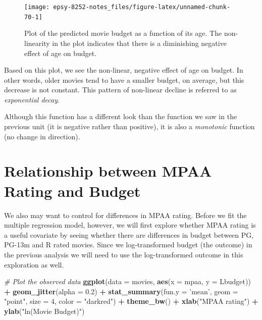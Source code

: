 \documentclass[]{book}
\newenvironment{Shaded}{\begin{snugshade}}{\end{snugshade}}
\newcommand{\CommentTok}[1]{\textcolor[rgb]{0.56,0.35,0.01}{\textit{#1}}}
\newcommand{\DataTypeTok}[1]{\textcolor[rgb]{0.13,0.29,0.53}{#1}}
\newcommand{\DecValTok}[1]{\textcolor[rgb]{0.00,0.00,0.81}{#1}}
\newcommand{\FloatTok}[1]{\textcolor[rgb]{0.00,0.00,0.81}{#1}}
\newcommand{\KeywordTok}[1]{\textcolor[rgb]{0.13,0.29,0.53}{\textbf{#1}}}
\newcommand{\NormalTok}[1]{#1}
\newcommand{\OperatorTok}[1]{\textcolor[rgb]{0.81,0.36,0.00}{\textbf{#1}}}
\newcommand{\StringTok}[1]{\textcolor[rgb]{0.31,0.60,0.02}{#1}}
\begin{document}
\begin{figure}

{\centering \texttt{[image: epsy-8252-notes\_files/figure-latex/unnamed-chunk-70-1]} 

}

\caption{Plot of the predicted movie budget as a function of its age. The non-linearity in the plot indicates that there is a diminishing negative effect of age on budget.}\label{fig:unnamed-chunk-70}
\end{figure}

Based on this plot, we see the non-linear, negative effect of age on budget. In other words, older movies tend to have a smaller budget, on average, but this decrease is not constant. This pattern of non-linear decline is referred to as \emph{exponential decay}.

Although this function has a different look than the function we saw in the previous unit (it is negative rather than positive), it is also a \emph{monotonic} function (no change in direction).

\hypertarget{relationship-between-mpaa-rating-and-budget}{%
\section{Relationship between MPAA Rating and Budget}\label{relationship-between-mpaa-rating-and-budget}}

We also may want to control for differences in MPAA rating. Before we fit the multiple regression model, however, we will first explore whether MPAA rating is a useful covariate by seeing whether there are differences in budget between PG, PG-13m and R rated movies. Since we log-transformed budget (the outcome) in the previous analysis we will need to use the log-transformed outcome in this exploration as well.

\begin{Shaded}
\begin{Highlighting}[]
\CommentTok{# Plot the observed data}
\KeywordTok{ggplot}\NormalTok{(}\DataTypeTok{data =}\NormalTok{ movies, }\KeywordTok{aes}\NormalTok{(}\DataTypeTok{x =}\NormalTok{ mpaa, }\DataTypeTok{y =}\NormalTok{ Lbudget)) }\OperatorTok{+}
\StringTok{  }\KeywordTok{geom_jitter}\NormalTok{(}\DataTypeTok{alpha =} \FloatTok{0.2}\NormalTok{) }\OperatorTok{+}
\StringTok{  }\KeywordTok{stat_summary}\NormalTok{(}\DataTypeTok{fun.y =} \StringTok{'mean'}\NormalTok{, }\DataTypeTok{geom =} \StringTok{"point"}\NormalTok{, }\DataTypeTok{size =} \DecValTok{4}\NormalTok{, }\DataTypeTok{color =} \StringTok{"darkred"}\NormalTok{) }\OperatorTok{+}
\StringTok{    }\KeywordTok{theme_bw}\NormalTok{() }\OperatorTok{+}
\StringTok{    }\KeywordTok{xlab}\NormalTok{(}\StringTok{"MPAA rating"}\NormalTok{) }\OperatorTok{+}
\StringTok{    }\KeywordTok{ylab}\NormalTok{(}\StringTok{"ln(Movie Budget)"}\NormalTok{)}
\end{Highlighting}
\end{Shaded}
\end{document}
